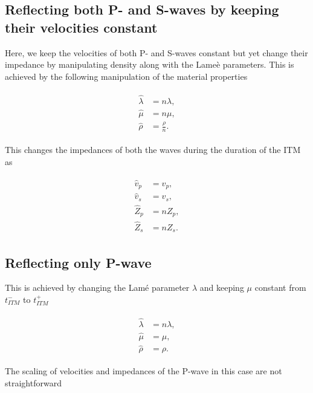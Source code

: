 \subsection{Reflecting both P- and S-waves by keeping their velocities constant}\label{sec:reflecting_both_constant}
Here, we keep the velocities of both P- and S-waves constant but yet change their impedance by manipulating density along with the Lame\`{e} parameters. This is achieved by the following manipulation of the material properties

\begin{align}
    \begin{split}
        \hat{\lambda} &= n \lambda ,\\
        \hat{\mu} &= n \mu ,\\
        \hat{\rho} &= \frac{\rho} {n} .
    \end{split}
\end{align}

This changes the impedances of both the waves during the duration of the \ac{ITM} as

\begin{align}
    \begin{split}
        \hat{v}_p &= v_p ,\\
        \hat{v}_s &= v_s ,\\
        \hat{Z}_p &= n Z_p ,\\
        \hat{Z}_s &= n Z_s .
    \end{split}
\end{align}

\subsection{Reflecting only P-wave}\label{sec:reflecting_p}

This is achieved by changing the Lam\'{e} parameter $\lambda$ and keeping $\mu$ constant from $t_{ITM}^-$ to $t_{ITM}^+$

\begin{align}
    \begin{split}
        \hat{\lambda} &= n \lambda ,\\
        \hat{\mu} &= \mu ,\\
        \hat{\rho} &= \rho .
    \end{split}
\end{align}

The scaling of velocities and impedances of the P-wave in this case are not straightforward 

